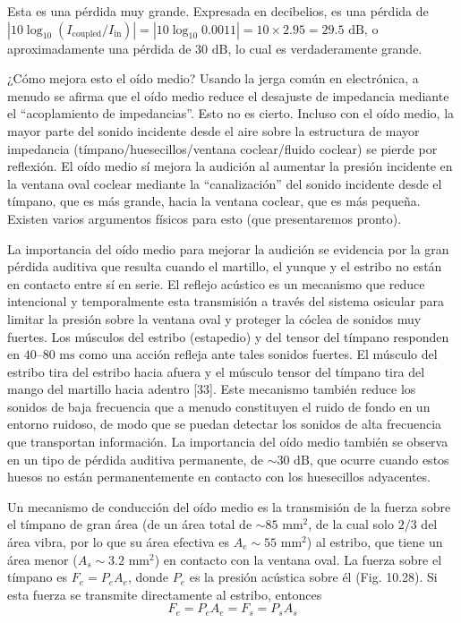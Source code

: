\documentclass[12pt]{book}
\begin{document}
Esta es una pérdida muy grande. Expresada en decibelios, es una pérdida de $|10 \log_{10}(I_{\text{coupled}}/I_{\text{in}})| = |10 \log_{10} 0.0011| = 10 \times 2.95 = 29.5\text{ dB}$, o aproximadamente una pérdida de $30\text{ dB}$, lo cual es verdaderamente grande.

¿Cómo mejora esto el oído medio? Usando la jerga común en electrónica, a menudo se afirma que el oído medio reduce el desajuste de impedancia mediante el ``acoplamiento de impedancias''. Esto no es cierto. Incluso con el oído medio, la mayor parte del sonido incidente desde el aire sobre la estructura de mayor impedancia (tímpano/huesecillos/ventana coclear/fluido coclear) se pierde por reflexión. El oído medio sí mejora la audición al aumentar la presión incidente en la ventana oval coclear mediante la ``canalización'' del sonido incidente desde el tímpano, que es más grande, hacia la ventana coclear, que es más pequeña. Existen varios argumentos físicos para esto (que presentaremos pronto).

La importancia del oído medio para mejorar la audición se evidencia por la gran pérdida auditiva que resulta cuando el martillo, el yunque y el estribo no están en contacto entre sí en serie. El reflejo acústico es un mecanismo que reduce intencional y temporalmente esta transmisión a través del sistema osicular para limitar la presión sobre la ventana oval y proteger la cóclea de sonidos muy fuertes. Los músculos del estribo (estapedio) y del tensor del tímpano responden en $40\text{--}80\text{ ms}$ como una acción refleja ante tales sonidos fuertes. El músculo del estribo tira del estribo hacia afuera y el músculo tensor del tímpano tira del mango del martillo hacia adentro [33]. Este mecanismo también reduce los sonidos de baja frecuencia que a menudo constituyen el ruido de fondo en un entorno ruidoso, de modo que se puedan detectar los sonidos de alta frecuencia que transportan información. La importancia del oído medio también se observa en un tipo de pérdida auditiva permanente, de $\sim 30\text{ dB}$, que ocurre cuando estos huesos no están permanentemente en contacto con los huesecillos adyacentes.

Un mecanismo de conducción del oído medio es la transmisión de la fuerza sobre el tímpano de gran área (de un área total de $\sim 85\text{ mm}^2$, de la cual solo $2/3$ del área vibra, por lo que su área efectiva es $A_e \sim 55\text{ mm}^2$) al estribo, que tiene un área menor ($A_s \sim 3.2\text{ mm}^2$) en contacto con la ventana oval. La fuerza sobre el tímpano es $F_e = P_e A_e$, donde $P_e$ es la presión acústica sobre él (Fig. 10.28). Si esta fuerza se transmite directamente al estribo, entonces
\begin{equation}
F_e = P_e A_e = F_s = P_s A_s
\label{eq:10.53}
\end{equation}
\end{document}

